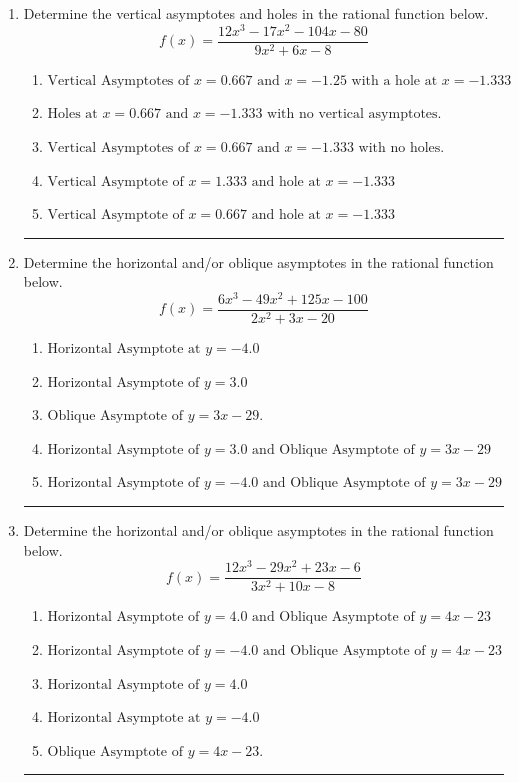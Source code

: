 \documentclass[14pt]{extbook}
\newcommand{\litem}[1]{\item#1\hspace*{-1cm}\rule{\textwidth}{0.4pt}}
\begin{document}
\begin{enumerate}
{\begin{enumerate}[label=\Alph*.]
\end{enumerate} }
\litem{
Determine the vertical asymptotes and holes in the rational function below.\[ f(x) = \frac{12x^{3} -17 x^{2} -104 x -80}{9x^{2} +6 x -8} \]\begin{enumerate}[label=\Alph*.]
\item \( \text{Vertical Asymptotes of } x = 0.667 \text{ and } x = -1.25 \text{ with a hole at } x = -1.333 \)
\item \( \text{Holes at } x = 0.667 \text{ and } x = -1.333 \text{ with no vertical asymptotes.} \)
\item \( \text{Vertical Asymptotes of } x = 0.667 \text{ and } x = -1.333 \text{ with no holes.} \)
\item \( \text{Vertical Asymptote of } x = 1.333 \text{ and hole at } x = -1.333 \)
\item \( \text{Vertical Asymptote of } x = 0.667 \text{ and hole at } x = -1.333 \)

\end{enumerate} }
\litem{
Determine the horizontal and/or oblique asymptotes in the rational function below.\[ f(x) = \frac{6x^{3} -49 x^{2} +125 x -100}{2x^{2} +3 x -20} \]\begin{enumerate}[label=\Alph*.]
\item \( \text{Horizontal Asymptote at } y = -4.0 \)
\item \( \text{Horizontal Asymptote of } y = 3.0  \)
\item \( \text{Oblique Asymptote of } y = 3x -29. \)
\item \( \text{Horizontal Asymptote of } y = 3.0 \text{ and Oblique Asymptote of } y = 3x -29 \)
\item \( \text{Horizontal Asymptote of } y = -4.0 \text{ and Oblique Asymptote of } y = 3x -29 \)

\end{enumerate} }
\litem{
Determine the horizontal and/or oblique asymptotes in the rational function below.\[ f(x) = \frac{12x^{3} -29 x^{2} +23 x -6}{3x^{2} +10 x -8} \]\begin{enumerate}[label=\Alph*.]
\item \( \text{Horizontal Asymptote of } y = 4.0 \text{ and Oblique Asymptote of } y = 4x -23 \)
\item \( \text{Horizontal Asymptote of } y = -4.0 \text{ and Oblique Asymptote of } y = 4x -23 \)
\item \( \text{Horizontal Asymptote of } y = 4.0  \)
\item \( \text{Horizontal Asymptote at } y = -4.0 \)
\item \( \text{Oblique Asymptote of } y = 4x -23. \)

\end{enumerate} }
\end{enumerate}
\end{document}
